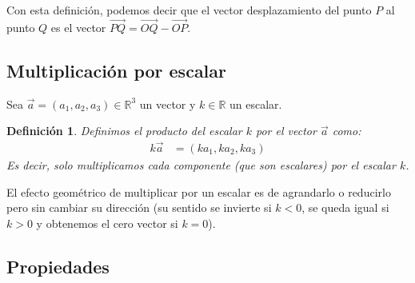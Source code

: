 \documentclass[12pt, fleqn]{report}                             %
\newtheorem{Definition}{Definición}[section]                    %
\newcommand{\ve}[1]{\vec{#1}}									%
\newcommand{\Ve}[1]{\overrightarrow{#1}}
\begin{document}
			Con esta definición, podemos decir que el vector desplazamiento del punto $P$ al punto $Q$ es el vector $\Ve{PQ} = \Ve{OQ} - \Ve{OP}$.
			
			
			\subsection{Multiplicación por escalar}
			
			Sea $\ve{a}=(a_1, a_2, a_3) \in \mathbb{R}^3$ un vector y $k \in \mathbb{R}$ un escalar.
			
			\begin{Definition}
				Definimos el producto del escalar $k$ por el vector $\ve{a}$ como:
				\begin{align}
					k\ve{a} &= (ka_1, ka_2, ka_3) \label{defMult}
				\end{align}
				Es decir, solo multiplicamos cada componente (que son escalares) por el escalar $k$.
			\end{Definition}
			El efecto geométrico de multiplicar por un escalar es de agrandarlo o reducirlo pero sin cambiar su dirección (su sentido se invierte si $k<0$, se queda igual si $k>0$ y obtenemos el cero vector si $k=0$).
			
			\subsection{Propiedades}
			
\end{document}

